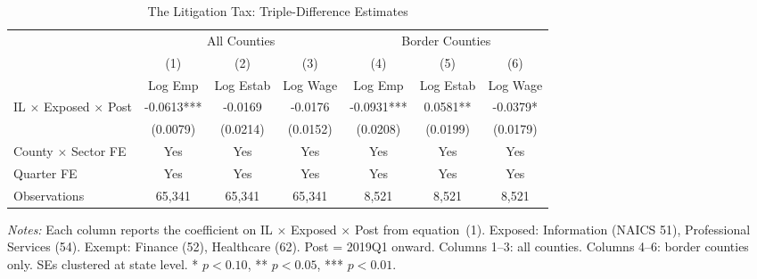 \begin{table}[H]
\centering
\caption{The Litigation Tax: Triple-Difference Estimates}
\label{tab:main}
\begin{adjustbox}{max width=\textwidth}
\begin{threeparttable}
\begin{tabular}{lcccccc}
\toprule
 & \multicolumn{3}{c}{All Counties} & \multicolumn{3}{c}{Border Counties} \\
\cmidrule(lr){2-4} \cmidrule(lr){5-7}
 & (1) & (2) & (3) & (4) & (5) & (6) \\
 & Log Emp & Log Estab & Log Wage & Log Emp & Log Estab & Log Wage \\
\midrule
IL $\times$ Exposed $\times$ Post & -0.0613*** & -0.0169 & -0.0176 & -0.0931*** & 0.0581** & -0.0379* \\
 & (0.0079) & (0.0214) & (0.0152) & (0.0208) & (0.0199) & (0.0179) \\
\midrule
County $\times$ Sector FE & Yes & Yes & Yes & Yes & Yes & Yes \\
Quarter FE & Yes & Yes & Yes & Yes & Yes & Yes \\
Observations & 65,341 & 65,341 & 65,341 & 8,521 & 8,521 & 8,521 \\
\bottomrule
\end{tabular}
\begin{tablenotes}[flushleft]
\footnotesize
\item \textit{Notes:} Each column reports the coefficient on IL $\times$ Exposed $\times$ Post from equation~(1). Exposed: Information (NAICS 51), Professional Services (54). Exempt: Finance (52), Healthcare (62). Post = 2019Q1 onward. Columns 1--3: all counties. Columns 4--6: border counties only. SEs clustered at state level. * $p<0.10$, ** $p<0.05$, *** $p<0.01$.
\end{tablenotes}
\end{threeparttable}
\end{adjustbox}
\end{table}

